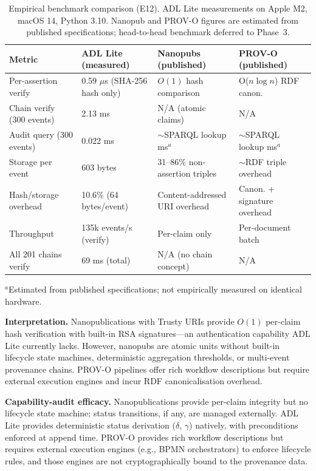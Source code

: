\begin{table}[htbp]
\centering
\caption{Empirical benchmark comparison (E12). ADL Lite measurements on Apple M2, macOS 14, Python 3.10. Nanopub and PROV-O figures are estimated from published specifications; head-to-head benchmark deferred to Phase~3.}
\label{tab:comparative-benchmark-full}
\begin{tabular}{@{}p{3.5cm}lll@{}}
\toprule
\textbf{Metric} & \textbf{ADL Lite (measured)} & \textbf{Nanopubs (published)} & \textbf{PROV-O (published)} \\
\midrule
Per-assertion verify & 0.59 $\mu$s (SHA-256 hash only) & $O(1)$ hash comparison \cite{trusty_uris} & O($n\log n$) RDF canon.~\cite{w3c_rdf_canon} \\
Chain verify (300 events) & 2.13 ms & N/A (atomic claims) & N/A \\
Audit query (300 events) & 0.022 ms & $\sim$SPARQL lookup ms$^a$ & $\sim$SPARQL lookup ms$^a$ \\
Storage per event & 603 bytes & 31--86\% non-assertion triples \cite{nanopublications} & $\sim$RDF triple overhead \\
Hash/storage overhead & 10.6\% (64 bytes/event) & Content-addressed URI overhead & Canon. + signature overhead \\
Throughput & 135k events/s (verify) & Per-claim only & Per-document batch \\
All 201 chains verify & 69 ms (total) & N/A (no chain concept) & N/A \\
\bottomrule
\end{tabular}
\end{table}

$^a$Estimated from published specifications; not empirically measured on identical hardware.

\textbf{Interpretation.} Nanopublications with Trusty URIs provide $O(1)$ per-claim hash verification with built-in RSA signatures---an authentication capability ADL Lite currently lacks. However, nanopubs are atomic units without built-in lifecycle state machines, deterministic aggregation thresholds, or multi-event provenance chains. PROV-O pipelines offer rich workflow descriptions but require external execution engines and incur RDF canonicalisation overhead.

\textbf{Capability-audit efficacy.} Nanopublications provide per-claim integrity but no lifecycle state machine; status transitions, if any, are managed externally. ADL Lite provides deterministic status derivation ($\delta$, $\gamma$) natively, with preconditions enforced at append time. PROV-O provides rich workflow descriptions but requires external execution engines (e.g., BPMN orchestrators) to enforce lifecycle rules, and those engines are not cryptographically bound to the provenance data.

